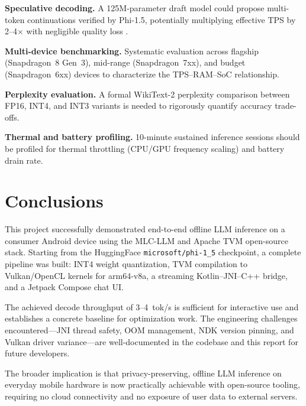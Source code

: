 \documentclass[12pt,letterpaper]{article}
\begin{document}
\textbf{Speculative decoding.}
A 125M-parameter draft model could propose multi-token continuations verified
by Phi-1.5, potentially multiplying effective TPS by 2--4$\times$ with
negligible quality loss \cite{ondevice2026}.

\textbf{Multi-device benchmarking.}
Systematic evaluation across flagship (Snapdragon~8 Gen~3), mid-range
(Snapdragon~7xx), and budget (Snapdragon~6xx) devices to characterize the
TPS--RAM--SoC relationship.

\textbf{Perplexity evaluation.}
A formal WikiText-2 perplexity comparison between FP16, INT4, and INT3
variants is needed to rigorously quantify accuracy trade-offs.

\textbf{Thermal and battery profiling.}
10-minute sustained inference sessions should be profiled for thermal
throttling (CPU/GPU frequency scaling) and battery drain rate.

\section{Conclusions}

This project successfully demonstrated end-to-end offline LLM inference on
a consumer Android device using the MLC-LLM and Apache TVM open-source stack.
Starting from the HuggingFace \texttt{microsoft/phi-1\_5} checkpoint,
a complete pipeline was built: INT4 weight quantization, TVM compilation
to Vulkan/OpenCL kernels for arm64-v8a, a streaming Kotlin--JNI--C++ bridge,
and a Jetpack Compose chat UI.

The achieved decode throughput of 3--4~tok/s is sufficient for interactive
use and establishes a concrete baseline for optimization work.
The engineering challenges encountered---JNI thread safety, OOM management,
NDK version pinning, and Vulkan driver variance---are well-documented in
the codebase and this report for future developers.

The broader implication is that privacy-preserving, offline LLM inference
on everyday mobile hardware is now practically achievable with open-source
tooling, requiring no cloud connectivity and no exposure of user data to
external servers.
\end{document}
